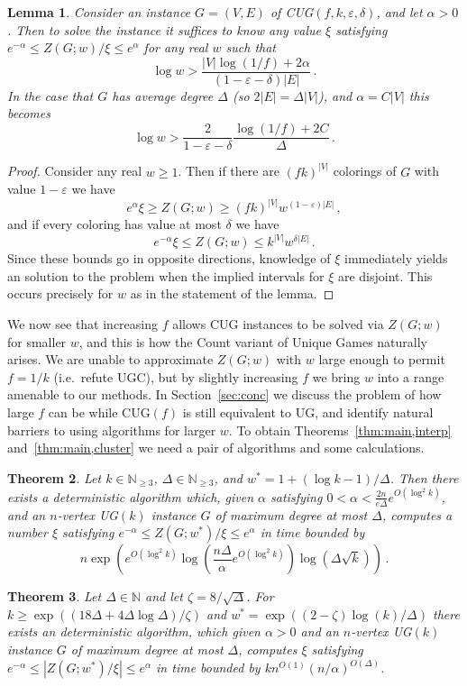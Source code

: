\documentclass[10pt,a4paper]{article}
\newtheorem{theorem}{Theorem}
\newtheorem{lemma}[theorem]{Lemma}
\theoremstyle{definition}
\newcommand*{\eps}{\varepsilon}
\newcommand*{\UG}[1][]{UG$(#1)$}
\newcommand*{\CUG}[1][]{CUG$(#1)$}
\begin{document}
%
\begin{lemma}\label{lem:solveCUG}
Consider an instance $G=(V,E)$ of \CUG[f,k,\eps,\delta], and let $\alpha>0$. 
Then to solve the instance it suffices to know any value $\xi$ satisfying $e^{-\alpha} \le Z(G;w)/\xi \le e^\alpha$ for any real $w$ such that
\[
\log w > \frac{|V|\log(1/f)+2\alpha}{(1-\eps-\delta)|E|}\,.
\]
In the case that $G$ has average degree $\Delta$ (so $2|E|=\Delta|V|$), and $\alpha=C|V|$ this becomes 
\[
\log w > \frac{2}{1-\eps-\delta}\frac{\log(1/f)+2C}{\Delta}\,.
\]
\end{lemma}
%
\begin{proof}
Consider any real $w\ge 1$.
Then if there are $(fk)^{|V|}$ colorings of $G$ with value $1-\eps$ we have 
\[
e^{\alpha}\xi \ge Z(G;w) \ge (fk)^{|V|}w^{(1-\eps)|E|}\,,
\]
and if every coloring has value at most $\delta$ we have 
\[
e^{-\alpha}\xi \le Z(G;w)\le k^{|V|}w^{\delta|E|}\,.
\] 
Since these bounds go in opposite directions, knowledge of $\xi$ immediately yields an solution to the problem when the implied intervals for $\xi$ are disjoint. 
This occurs precisely for $w$ as in the statement of the lemma. 
\end{proof}
%
We now see that increasing $f$ allows CUG instances to be solved via $Z(G;w)$ for smaller $w$, and this is how the Count variant of Unique Games naturally arises. 
We are unable to approximate $Z(G;w)$ with $w$ large enough to permit $f=1/k$ (i.e.\ refute UGC), but by slightly increasing $f$ we bring $w$ into a range amenable to our methods. 
In Section~\ref{sec:conc} we discuss the problem of how large $f$ can be while \CUG[f] is still equivalent to UG, and identify natural barriers to using algorithms for larger $w$.
To obtain Theorems~\ref{thm:main,interp} and~\ref{thm:main,cluster} we need a pair of algorithms and some calculations. 
%
\begin{theorem}\label{thm:alg,interp}
Let $k\in \mathbb{N}_{\geq 3}$, $\Delta\in \mathbb{N}_{\geq 3}$, and $w^*=1+(\log k -1)/\Delta$. 
Then there exists a deterministic algorithm which, given $\alpha$ satisfying $0<\alpha<\frac{2n}{e\Delta}e^{O(\log^2 k)}$,
and an $n$-vertex \UG[k] instance $G$ of maximum degree at most $\Delta$, computes a number $\xi$ satisfying $e^{-\alpha} \le Z(G;w^*)/\xi \le e^{\alpha}$ in time bounded by
\[
n\exp\left(e^{O(\log^2 k)} \log\left(\frac{n\Delta}{\alpha}e^{O(\log^2 k)}\right)\log(\Delta\sqrt k)\right)\,.
\]
\end{theorem}
%
\begin{theorem}\label{thm:alg,cluster}
Let $\Delta\in \mathbb{N}$ and let $\zeta=8/\sqrt{\Delta}$.
For $k\geq\exp{((18\Delta+4\Delta\log\Delta)/\zeta)}$ and $w^*=\exp((2-\zeta) \log(k)/\Delta)$ there exists an deterministic algorithm, which given $\alpha>0$ and an $n$-vertex \UG[k] instance $G$ of maximum degree at most $\Delta$, computes $\xi$ satisfying $e^{-\alpha}\le |Z(G;w^*)/\xi| \le e^\alpha$ in time bounded by $kn^{O(1)}(n/\alpha)^{O(\Delta)}$.
\end{theorem}
\end{document}
